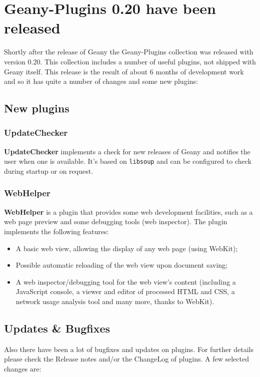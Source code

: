 \documentclass[%
paper=a4,%
fontsize=12pt,%
twoside=false,%
DIV18,
headsepline,
plainheadsepline,
footsepline,
plainfootsepline,
parskip=half,%
openany,%
]{scrartcl}
\begin{document}
\section{Geany-Plugins 0.20 have been released}

Shortly after the release of Geany the Geany-Plugins collection
was released with version 0.20. This collection
includes a number of useful plugins, not shipped with Geany itself.
This release is the result of about 6 months of development work
and so it has quite a number of changes and some new plugins:

\subsection{New plugins}
\subsubsection{UpdateChecker}

\textbf{UpdateChecker} implements a check for new
releases of Geany and notifies the user when one is
available. It's based on \texttt{libsoup} and can be configured to check
during startup or on request.

\subsubsection{WebHelper}

\textbf{WebHelper} is a plugin that provides some web
development facilities, such as a web page preview and some
debugging tools (web inspector). The plugin implements
the following features:

\begin{itemize}
	\item A basic web view, allowing the display of any web page (using WebKit);
	\item Possible automatic reloading of the web view upon document saving;
	\item A web inspector/debugging tool for the web view's content (including a
		JavaScript console, a viewer and editor of processed HTML and CSS, a network
		usage analysis tool and many more, thanks to WebKit).
\end{itemize}

\subsection{Updates \& Bugfixes}

Also there have been a lot of bugfixes and updates on plugins. For
further details please check the Release notes and/or the ChangeLog
of plugins. A few selected changes are:
\end{document}
